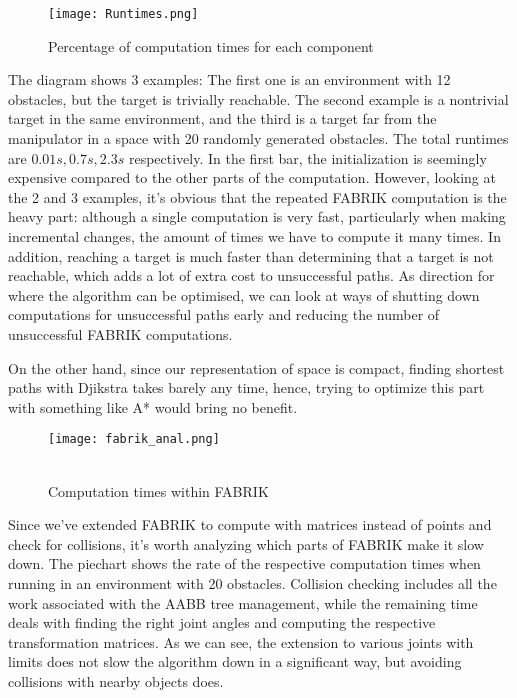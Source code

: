 \newpage
\begin{wrapfigure}{r}{0.50\textwidth}
  \centering
  \texttt{[image: Runtimes.png]}
  \caption{Percentage of computation times for each component}
\end{wrapfigure}

The diagram shows 3 examples: The first one is an environment with 12 obstacles, but the target is trivially reachable. The second example is a nontrivial target in the same environment, and the third is a target far from the manipulator in a space with 20 randomly generated obstacles. The total runtimes are $0.01s, 0.7s, 2.3s$ respectively. In the first bar, the initialization is seemingly expensive compared to the other parts of the computation. However, looking at the 2\nd{} and 3\rd{} examples, it's obvious that the repeated FABRIK computation is the heavy part: although a single computation is very fast, particularly when making incremental changes, the amount of times we have to compute it many times. In addition, reaching a target is much faster than determining that a target is not reachable, which adds a lot of extra cost to unsuccessful paths. As direction for where the algorithm can be optimised, we can look at ways of shutting down computations for unsuccessful paths early and reducing the number of unsuccessful FABRIK computations.

On the other hand, since our representation of space is compact, finding shortest paths with Djikstra takes barely any time, hence, trying to optimize this part with something like A* would bring no benefit.

\begin{wrapfigure}{l}{0.4\textwidth}
  \centering
  \texttt{[image: fabrik\_anal.png]}
  \caption{\\Computation times within FABRIK}
\end{wrapfigure}

Since we've extended FABRIK to compute with matrices instead of points and check for collisions, it's worth analyzing which parts of FABRIK make it slow down. The piechart shows the rate of the respective computation times when running in an environment with 20 obstacles. Collision checking includes all the work associated with the AABB tree management, while the remaining time deals with finding the right joint angles and computing the respective transformation matrices. As we can see, the extension to various joints with limits does not slow the algorithm down in a significant way, but avoiding collisions with nearby objects does.

